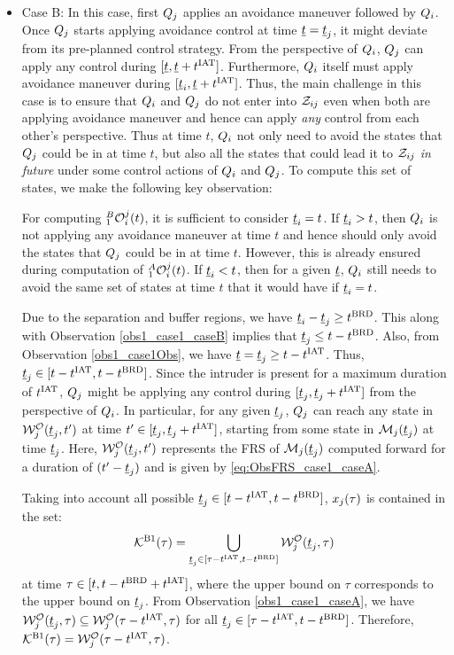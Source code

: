 \begin{itemize}[leftmargin=*]
\item \label{sec:intruderObs_case1_caseB} Case B: In this case, first $Q_j$ applies an avoidance maneuver followed by $Q_i$. Once $Q_j$ starts applying avoidance control at time $\underline{t} = \underline{t}_j$, it might deviate from its pre-planned control strategy. From the perspective of $Q_i$, $Q_j$ can apply any control during $[\underline{t}, \underline{t}+t^\text{IAT}]$. Furthermore, $Q_i$ itself must apply avoidance maneuver during $[\underline{t}_i, \underline{t}+t^\text{IAT}]$. Thus, the main challenge in this case is to ensure that $Q_i$ and $Q_j$ do not enter into $\mathcal{Z}_{ij}$ even when both are applying avoidance maneuver and hence can apply \textit{any} control from each other's perspective. Thus at time $t$, $Q_i$ not only need to avoid the states that $Q_j$ could be in at time $t$, but also all the states that could lead it to $\mathcal{Z}_{ij}$ \textit{in future} under some control actions of $Q_i$ and $Q_j$. To compute this set of states, we make the following key observation:
\begin{observation} \label{obs1_case1_caseB}
For computing $_1^B\mathcal{O}_i^j(t)$, it is sufficient to consider $\underline{t}_i = t$. If $\underline{t}_i > t$, then $Q_i$ is not applying any avoidance maneuver at time $t$ and hence should only avoid the states that $Q_j$ could be in at time $t$. However, this is already ensured during computation of $_1^A\mathcal{O}_i^j(t)$. If $\underline{t}_i < t$, then for a given $\underline{t}$, $Q_i$ still needs to avoid the same set of states at time $t$ that it would have if $\underline{t}_i = t$.  
\end{observation}

Due to the separation and buffer regions, we have $\underline{t}_i - \underline{t}_j \geq t^\text{BRD}$. This along with Observation \ref{obs1_case1_caseB} implies that $\underline{t}_j \leq t - t^\text{BRD}$. Also, from Observation \ref{obs1_case1Obs}, we have $\underline{t} = \underline{t}_j \geq t-t^\text{IAT}$. Thus, $\underline{t}_j \in [t-t^\text{IAT}, t-t^\text{BRD}]$. Since the intruder is present for a maximum duration of $t^\text{IAT}$, $Q_j$ might be applying any control during $[\underline{t}_j, \underline{t}_j + t^\text{IAT}]$ from the perspective of $Q_i$. In particular, for any given $\underline{t}_j$, $Q_j$ can reach any state in $\mathcal{W}_{j}^{\mathcal{O}}(\underline{t}_j, t')$ at time $t' \in [\underline{t}_j, \underline{t}_j+t^\text{IAT}]$, starting from some state in $\mathcal{M}_j(\underline{t}_j)$ at time $\underline{t}_j$. Here, $\mathcal{W}_{j}^{\mathcal{O}}(\underline{t}_j, t')$ represents the FRS of $\mathcal{M}_j(\underline{t}_j)$ computed forward for a duration of $(t' - \underline{t}_j)$ and is given by \eqref{eq:ObsFRS_case1_caseA}. 

Taking into account all possible $\underline{t}_j \in [t-t^\text{IAT}, t-t^\text{BRD}]$, $x_j(\tau)$ is contained in the set:
\begin{equation}
\mathcal{K}^{\text{B1}}(\tau) = \bigcup_{\underline{t}_j \in [\tau-t^\text{IAT}, t-t^\text{BRD}]} \mathcal{W}_{j}^{\mathcal{O}}(\underline{t}_j, \tau)
\end{equation} 
at time $\tau \in [t, t-t^\text{BRD}+t^\text{IAT}]$, where the upper bound on $\tau$ corresponds to the upper bound on $\underline{t}_j$. From Observation \ref{obs1_case1_caseA}, we have $\mathcal{W}_{j}^{\mathcal{O}}(\underline{t}_j, \tau) \subseteq \mathcal{W}_{j}^{\mathcal{O}}(\tau-t^\text{IAT}, \tau)$ for all $\underline{t}_j \in [\tau-t^\text{IAT}, t-t^\text{BRD}]$. Therefore, $\mathcal{K}^{\text{B1}}(\tau) = \mathcal{W}_{j}^{\mathcal{O}}(\tau-t^\text{IAT}, \tau)$.


\end{itemize}

